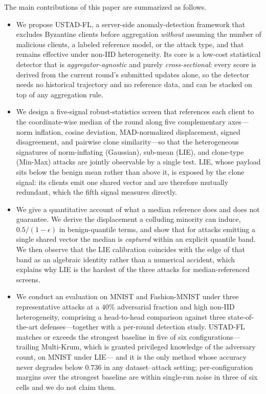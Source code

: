 \documentclass[journal]{IEEEtran}
\begin{document}
The main contributions of this paper are summarized as follows.
\begin{itemize}
    \item We propose USTAD-FL, a server-side anomaly-detection framework that excludes Byzantine clients before aggregation \emph{without} assuming the number of malicious clients, a labeled reference model, or the attack type, and that remains effective under non-IID heterogeneity. Its core is a low-cost statistical detector that is \emph{aggregator-agnostic} and purely \emph{cross-sectional}: every score is derived from the current round's submitted updates alone, so the detector needs no historical trajectory and no reference data, and can be stacked on top of any aggregation rule.
    \item We design a five-signal robust-statistics screen that references each client to the coordinate-wise median of the round along five complementary axes---norm inflation, cosine deviation, MAD-normalized displacement, signed disagreement, and pairwise clone similarity---so that the heterogeneous signatures of norm-inflating (Gaussian), sub-mean (LIE), and clone-type (Min-Max) attacks are jointly observable by a single test. LIE, whose payload sits below the benign mean rather than above it, is exposed by the clone signal: its clients emit one shared vector and are therefore mutually redundant, which the fifth signal measures directly.
    \item We give a quantitative account of what a median reference does and does not guarantee. We derive the displacement a colluding minority can induce, $0.5/(1-\epsilon)$ in benign-quantile terms, and show that for attacks emitting a single shared vector the median is \emph{captured} within an explicit quantile band. We then observe that the LIE calibration coincides with the edge of that band as an algebraic identity rather than a numerical accident, which explains why LIE is the hardest of the three attacks for median-referenced screens.
    \item We conduct an evaluation on MNIST and Fashion-MNIST under three representative attacks at a $40\%$ adversarial fraction and high non-IID heterogeneity, comprising a head-to-head comparison against three state-of-the-art defenses---together with a per-round detection study. USTAD-FL matches or exceeds the strongest baseline in five of six configurations---trailing Multi-Krum, which is granted privileged knowledge of the adversary count, on MNIST under LIE--- and it is the only method whose accuracy never degrades below $0.736$ in any dataset--attack setting; per-configuration margins over the strongest baseline are within single-run noise in three of six cells and we do not claim them.
\end{itemize}
\end{document}
